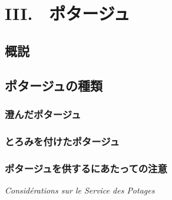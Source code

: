 \hypertarget{potages}{%
\chapter{III.　ポタージュ}\label{potages}}

\hypertarget{considerations-generales-potages}{%
\section{概説}\label{considerations-generales-potages}}


\hypertarget{classification-des-potages}{%
\section{ポタージュの種類}\label{classification-des-potages}}


\hypertarget{classification-potages-claires}{%
\subsection{澄んだポタージュ}\label{classification-potages-claires}}


\hypertarget{classification-potages-lies}{%
\subsection{とろみを付けたポタージュ}\label{classification-potages-lies}}


\hypertarget{consideration-sur-le-service-des-potages}{%
\subsection{ポタージュを供するにあたっての注意}\label{consideration-sur-le-service-des-potages}}

\vspace{-1\zw}
\begin{center}
\hspace{1\zw}\large\textit{Considérations sur le Service des Potages}
\normalsize
\end{center}
